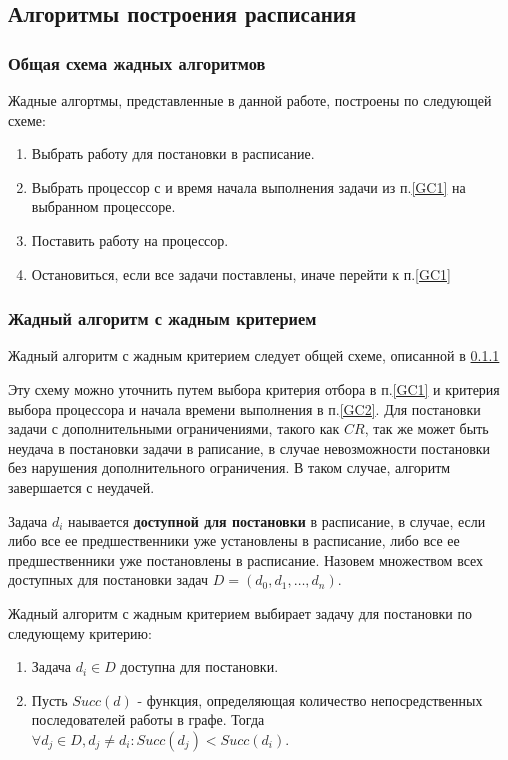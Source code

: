 \subsection{Алгоритмы построения расписания}
\subsubsection{Общая схема жадных алгоритмов} \label{algo_template}
Жадные алгортмы, представленные в данной работе, построены по следующей схеме:
\begin{enumerate}
    \item \label{GC1} Выбрать работу для постановки в расписание.
    \item \label{GC2} Выбрать процессор с и время начала выполнения задачи из п.\ref{GC1} на выбранном процессоре.
    \item Поставить работу на процессор.
    \item Остановиться, если все задачи поставлены, иначе перейти к п.\ref{GC1}
\end{enumerate}

\subsubsection{Жадный алгоритм с жадным критерием} \label{Greedy_GC1}
Жадный алгоритм с жадным критерием следует общей схеме, описанной в \ref{algo_template}

Эту схему можно уточнить путем выбора критерия отбора в п.\ref{GC1} и критерия выбора процессора и начала времени выполнения в п.\ref{GC2}. Для постановки задачи с дополнительными ограничениями, такого как $CR$, так же может быть неудача в постановки задачи в раписание, в случае невозможности постановки без нарушения дополнительного ограничения. В таком случае, алгоритм завершается с неудачей.

Задача $d_i$ наывается \textbf{доступной для постановки} в расписание, в случае, если либо все ее предшественники уже установлены в расписание, либо все ее предшественники уже постановлены в расписание. Назовем множеством всех доступных для постановки задач $D = \left( d_0, d_1, \ldots, d_n \right)$.

Жадный алгоритм с жадным критерием выбирает задачу для постановки по следующему критерию:
\begin{enumerate}
    \item Задача $d_i \in D$ доступна для постановки.
    \item Пусть $Succ(d)$ - функция, определяющая количество непосредственных последователей работы в графе. Тогда $\forall d_j \in D, d_j \neq d_i: Succ(d_j) < Succ(d_i)$.
\end{enumerate}

